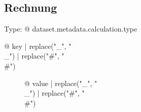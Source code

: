 \subsection{Rechnung}

Type: {@ dataset.metadata.calculation.type }

\begin{description}
\item[{@ key | replace("_", "\\_") | replace("#", "\\#") }] {@ value | replace("_", "\\_") | replace("#", "\\#") }
\end{description}
